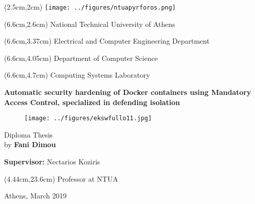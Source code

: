 \thispagestyle{empty}
\begin{textblock*}{6cm}(2.5cm,2cm) %
\texttt{[image: ../figures/ntuapyrforos.png]}
\end{textblock*}

\begingroup
 
\begin{mdseries}  
\begin{textblock*}{103cm}(6.6cm,2.6cm) %
\fontsize{16}{12}\selectfont 
National Technical University of Athens
\end{textblock*}
\fontsize{14}{12}\selectfont
\begin{textblock*}{103cm}(6.6cm,3.37cm)
Electrical and Computer Engineering Department
\end{textblock*}
\begin{textblock*}{103cm}(6.6cm,4.05cm)
Department of Computer Science
\end{textblock*}
\begin{textblock*}{103cm}(6.6cm,4.7cm)
Computing Systems Laboratory
\end{textblock*}

\hfill\break\hfill\break\hfill\break\hfill\break\hfill\break\hfill\break\hfill\break\hfill\break

\fontsize{18}{12}\selectfont
\begin{center}\textbf{Automatic security hardening of Docker containers using Mandatory Access Control, specialized in defending isolation}\end{center}
\hfill\break
\begin{figure}[h!]
  \centering
   \texttt{[image: ../figures/ekswfullo11.jpg]}
\end{figure}
\hfill\break
\fontsize{17}{20.5}\selectfont

\begin{center}
Diploma Thesis
\\
by \textbf{Fani Dimou}
\end{center}

\hfill\break

\hfill\break\hfill\break
\fontsize{13}{12}\selectfont
\textbf{Supervisor:} Nectarios Koziris
\begin{textblock*}{103cm}(4.44cm,23.6cm)
Professor at NTUA
\end{textblock*}

\hfill\break\hfill\break\hfill\break
\begin{center}
Athens, March 2019
\end{center}

\end{mdseries}
\endgroup


